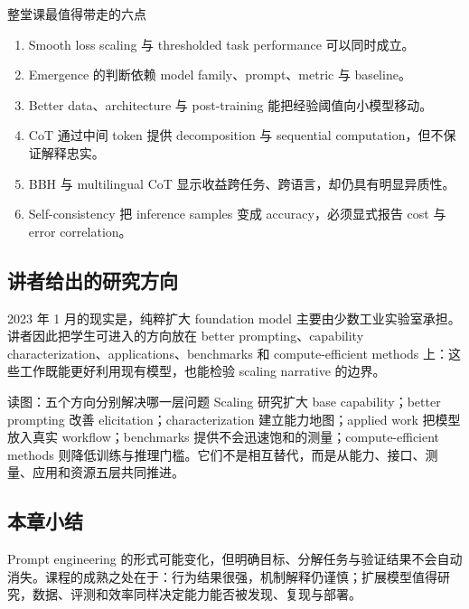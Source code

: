 \begin{importantbox}{整堂课最值得带走的六点}
\begin{enumerate}
  \item Smooth loss scaling 与 thresholded task performance 可以同时成立。
  \item Emergence 的判断依赖 model family、prompt、metric 与 baseline。
  \item Better data、architecture 与 post-training 能把经验阈值向小模型移动。
  \item CoT 通过中间 token 提供 decomposition 与 sequential computation，但不保证解释忠实。
  \item BBH 与 multilingual CoT 显示收益跨任务、跨语言，却仍具有明显异质性。
  \item Self-consistency 把 inference samples 变成 accuracy，必须显式报告 cost 与 error correlation。
\end{enumerate}
\end{importantbox}

\subsection{讲者给出的研究方向}

2023 年 1 月的现实是，纯粹扩大 foundation model 主要由少数工业实验室承担。讲者因此把学生可进入的方向放在 better prompting、capability characterization、applications、benchmarks 和 compute-efficient methods 上：这些工作既能更好利用现有模型，也能检验 scaling narrative 的边界。


\begin{knowledgebox}{读图：五个方向分别解决哪一层问题}
Scaling 研究扩大 base capability；better prompting 改善 elicitation；characterization 建立能力地图；applied work 把模型放入真实 workflow；benchmarks 提供不会迅速饱和的测量；compute-efficient methods 则降低训练与推理门槛。它们不是相互替代，而是从能力、接口、测量、应用和资源五层共同推进。
\end{knowledgebox}


\subsection{本章小结}

Prompt engineering 的形式可能变化，但明确目标、分解任务与验证结果不会自动消失。课程的成熟之处在于：行为结果很强，机制解释仍谨慎；扩展模型值得研究，数据、评测和效率同样决定能力能否被发现、复现与部署。

